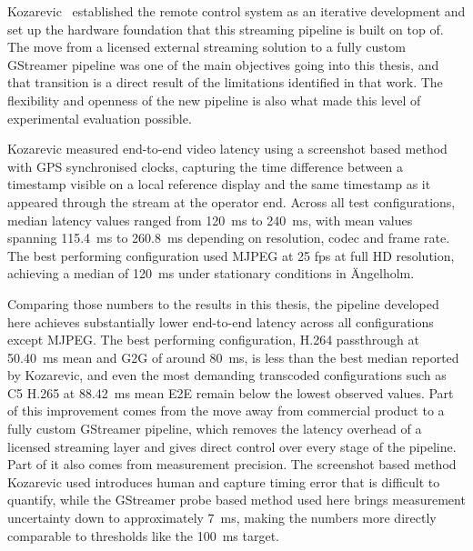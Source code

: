 Kozarevic~\cite{kozarevic2025} established the remote control system as an iterative development and set up the hardware foundation that this streaming pipeline is built on top of. The move from a licensed external streaming solution to a fully custom GStreamer pipeline was one of the main objectives going into this thesis, and that transition is a direct result of the limitations identified in that work. The flexibility and openness of the new pipeline is also what made this level of experimental evaluation possible.

Kozarevic measured end-to-end video latency using a screenshot based method with GPS synchronised clocks, capturing the time difference between a timestamp visible on a local reference display and the same timestamp as it appeared through the stream at the operator end. Across all test configurations, median latency values ranged from 120~ms to 240~ms, with mean values spanning 115.4~ms to 260.8~ms depending on resolution, codec and frame rate. The best performing configuration used MJPEG at 25 fps at full HD resolution, achieving a median of 120~ms under stationary conditions in Ängelholm.

Comparing those numbers to the results in this thesis, the pipeline developed here achieves substantially lower end-to-end latency across all configurations except MJPEG. The best performing configuration, H.264 passthrough at 50.40~ms mean and G2G of around 80~ms, is less than the best median reported by Kozarevic, and even the most demanding transcoded configurations such as C5 H.265 at 88.42~ms mean E2E remain below the lowest observed values. Part of this improvement comes from the move away from commercial product to a fully custom GStreamer pipeline, which removes the latency overhead of a licensed streaming layer and gives direct control over every stage of the pipeline. Part of it also comes from measurement precision. The screenshot based method Kozarevic used introduces human and capture timing error that is difficult to quantify, while the GStreamer probe based method used here brings measurement uncertainty down to approximately 7~ms, making the numbers more directly comparable to thresholds like the 100~ms target.
